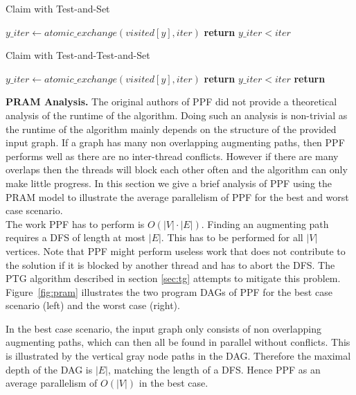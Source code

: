 \documentclass[letterpaper]{article}
\newcommand{\mypar}[1]{{\bf #1.}}
\begin{document}
\begin{algorithm}
    \caption{Claim with Test-and-Set}
    \label{alg:claim_tas}
    \begin{algorithmic}[1]
            \State $y\_iter \gets atomic\_exchange(visited[y], iter)$
            \State \textbf{return} $y\_iter < iter$
        \EndProcedure
    \end{algorithmic}
\end{algorithm}


\begin{algorithm}
    \caption{Claim with Test-and-Test-and-Set}
    \label{alg:claim_ttas}
    \begin{algorithmic}[1]
                \State $y\_iter \gets atomic\_exchange(visited[y], iter)$
                \State \textbf{return} $y\_iter < iter$
            \EndIf
            \State \textbf{return} \False
        \EndProcedure
    \end{algorithmic}
\end{algorithm}

\mypar{PRAM Analysis} The original authors of PPF did not provide a theoretical analysis of the runtime of the algorithm.
Doing such an analysis is non-trivial as the runtime of the algorithm mainly depends on the structure of the provided
input graph. If a graph has many non overlapping augmenting paths, then PPF performs well as there are no inter-thread conflicts. 
However if there are many overlaps then the threads will block each other often and the algorithm can only make little progress.
In this section we give a brief analysis of PPF using the PRAM model to illustrate the average parallelism of PPF for the best and worst case
scenario. \\

The work PPF has to perform is $O(|V|\cdot|E|)$. Finding an augmenting path requires a DFS of length at most $|E|$. 
This has to be performed for all $|V|$ vertices. Note that PPF might perform useless work that does not contribute to the solution
if it is blocked by another thread and has to abort the DFS. 
The PTG algorithm described in section \ref{sec:tg} attempts to mitigate this problem.\\

Figure~\ref{fig:pram} illustrates the two program DAGs of PPF for the best case scenario (left) and the worst case (right).

In the best case scenario, the input graph only consists of non overlapping augmenting paths, which can then all be found in parallel without conflicts. 
This is illustrated by the vertical gray node paths in the DAG.
Therefore the maximal depth of the DAG is $|E|$, matching the length of a DFS. Hence PPF as an average parallelism of $O(|V|)$ in the best case.
\end{document}
